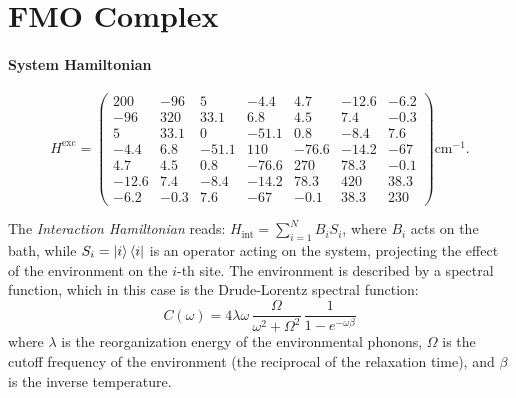\documentclass[a4paper,12pt]{article}
\begin{document}
\newpage

\section{FMO Complex}
\label{sec:FMO_complex}

\paragraph{System Hamiltonian} 

\begin{equation}
	H^{\text{exc}} = \begin{pmatrix}
		200 & -96 & 5 & -4.4 & 4.7 & -12.6 & -6.2 \\
		-96 & 320 & 33.1 & 6.8 & 4.5 & 7.4 & -0.3 \\
		5 & 33.1 & 0 & -51.1 & 0.8 & -8.4 & 7.6 \\
		-4.4 & 6.8 & -51.1 & 110 & -76.6 & -14.2 & -67 \\
		4.7 & 4.5 & 0.8 & -76.6 & 270 & 78.3 & -0.1 \\
		-12.6 & 7.4 & -8.4 & -14.2 & 78.3 & 420 & 38.3 \\
		-6.2 & -0.3 & 7.6 & -67 & -0.1 & 38.3 & 230 
	\end{pmatrix} \text{cm}^{-1}.
\end{equation}

The \textit{Interaction Hamiltonian} reads: $H_{\text{int}} = \sum_{i=1}^{N} B_{i}S_{i}$, where $B_{i}$ acts on the bath, while $S_{i} = \Ket{i} \Bra{i}$ is an operator acting on the system, projecting the effect of the environment on the $i$-th site.
The environment is described by a spectral function, which in this case is the Drude-Lorentz spectral function: 
\begin{equation}
	C(\omega) = 4 \lambda \omega \, \frac{\Omega}{\omega^{2} + \Omega^{2}} \, \frac{1}{1 - e^{-\omega\beta}}
\end{equation}
where $\lambda$ is the reorganization energy of the environmental phonons, $\Omega$ is the cutoff frequency of the environment (the reciprocal of the relaxation time), and $\beta$ is the inverse temperature.
\end{document}
